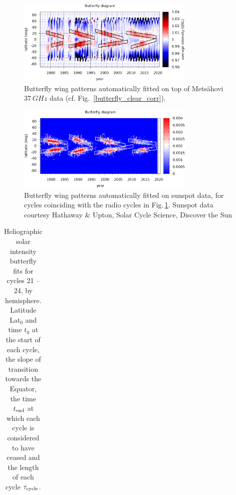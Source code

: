 \documentclass{aa}
\begin{document}
\begin{figure}
\centering
\includegraphics[width=8.5cm]{butterfly_wingfit_raw.png}
\caption{Butterfly wing patterns automatically fitted on top of Mets\"ahovi $\SI{37}{GHz}$ data (cf. Fig.~\ref{butterfly_clear_corr}).} 
\label{butterfly_wingfit_raw}
\end{figure}

\begin{figure}
\centering
\includegraphics[width=8.5cm]{butterfly_wingfit_sunspot.png}
\caption{Butterfly wing patterns automatically fitted on sunspot data, for
cycles coinciding with the radio cycles in Fig.\,\ref{butterfly_wingfit_raw}.
Sunspot data courtesy Hathaway \& Upton, Solar Cycle Science,
Discover the Sun}
\label{butterfly_wingfit_sunspot}
\end{figure}

\begin{table}
\caption{\label{tab:cycles}
Heliographic solar intensity butterfly fits for cycles 21 -- 24, by hemisphere.
Latitude Lat$_0$ and time $t_0$ at the start of each cycle, the slope of transition
towards the Equator, the time $t_{\rm end}$ at which each cycle is considered to have
ceased and the length of each cycle $\tau_{\rm cycle}$.
}
\begin{tabular}{l|ccccr}
\hline\hline

\hline
\end{tabular}
\end{table}
\end{document}
